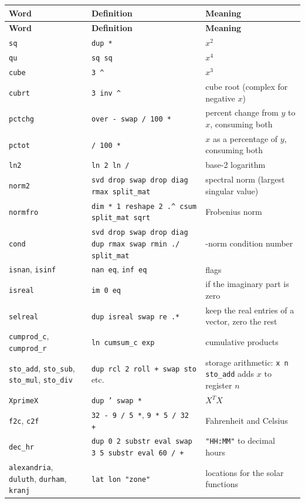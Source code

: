 \documentclass[11pt,letterpaper]{article}
\newcommand{\code}[1]{\texttt{#1}}
\begin{document}
\begin{longtable}{@{}>{\raggedright\arraybackslash}p{}>{\raggedright\arraybackslash}p{}>{\raggedright\arraybackslash}p{}@{}}
\toprule \textbf{Word} & \textbf{Definition} & \textbf{Meaning} \\ \midrule \endfirsthead
\toprule \textbf{Word} & \textbf{Definition} & \textbf{Meaning} \\ \midrule \endhead
\bottomrule \endlastfoot
\code{sq}      & \code{dup *}            & $x^2$ \\
\code{qu}      & \code{sq sq}            & $x^4$ \\
\code{cube}    & \code{3 \textasciicircum} & $x^3$ \\
\code{cubrt}   & \code{3 inv \textasciicircum} & cube root (complex for negative $x$) \\
\code{pctchg}  & \code{over - swap / 100 *} & percent change from $y$ to $x$, consuming both \\
\code{pctot}   & \code{/ 100 *}          & $x$ as a percentage of $y$, consuming both \\
\code{ln2}     & \code{ln 2 ln /}        & base-2 logarithm \\
\code{norm2}   & \code{svd drop swap drop diag rmax split\_mat} & spectral norm (largest singular value) \\
\code{normfro} & \code{dim * 1 reshape 2 .\textasciicircum{} csum split\_mat sqrt} & Frobenius norm \\
\code{cond}    & \code{svd drop swap drop diag dup rmax swap rmin ./ split\_mat} & 2-norm condition number \\
\code{isnan}, \code{isinf} & \code{nan eq}, \code{inf eq} & flags \\
\code{isreal}  & \code{im 0 eq}          & 1 if the imaginary part is zero \\
\code{selreal} & \code{dup isreal swap re .*} & keep the real entries of a vector, zero the rest \\
\code{cumprod\_c}, \code{cumprod\_r} & \code{ln cumsum\_c exp} & cumulative products \\
\code{sto\_add}, \code{sto\_sub}, \code{sto\_mul}, \code{sto\_div} & \code{dup rcl 2 roll + swap sto} etc. & storage arithmetic: \code{x n sto\_add} adds $x$ to register $n$ \\
\code{XprimeX} & \code{dup ' swap *}     & $X^T X$ \\
\code{f2c}, \code{c2f} & \code{32 - 9 / 5 *}, \code{9 * 5 / 32 +} & Fahrenheit and Celsius \\
\code{dec\_hr} & \code{dup 0 2 substr eval swap 3 5 substr eval 60 / +} & \code{"HH:MM"} to decimal hours \\
\code{alexandria}, \code{duluth}, \code{durham}, \code{kranj} & \code{lat lon "zone"} & locations for the solar functions \\
\end{longtable}
\end{document}
